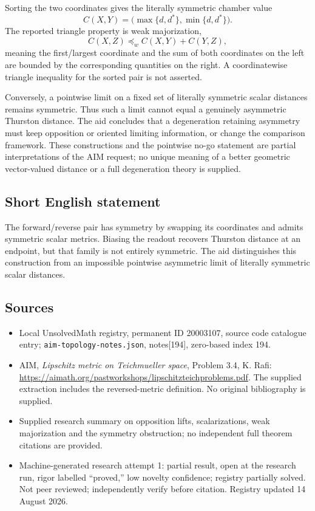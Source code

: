 \documentclass[11pt]{article}
\begin{document}
Sorting the two coordinates gives the literally symmetric chamber value
\[
 C(X,Y)=\bigl(\max\{d,d^*\},\min\{d,d^*\}\bigr).
\]
The reported triangle property is weak majorization,
\[
 C(X,Z)\preceq_w C(X,Y)+C(Y,Z),
\]
meaning the first/largest coordinate and the sum of both coordinates on the left are bounded by the corresponding quantities on the right. A coordinatewise triangle inequality for the sorted pair is not asserted.

Conversely, a pointwise limit on a fixed set of literally symmetric scalar distances remains symmetric. Thus such a limit cannot equal a genuinely asymmetric Thurston distance. The aid concludes that a degeneration retaining asymmetry must keep opposition or oriented limiting information, or change the comparison framework. These constructions and the pointwise no-go statement are partial interpretations of the AIM request; no unique meaning of a better geometric vector-valued distance or a full degeneration theory is supplied.
\subsection{Short English statement}
The forward/reverse pair has symmetry by swapping its coordinates and admits symmetric scalar metrics. Biasing the readout recovers Thurston distance at an endpoint, but that family is not entirely symmetric. The aid distinguishes this construction from an impossible pointwise asymmetric limit of literally symmetric scalar distances.
\subsection{Sources}
\begin{itemize}
\item Local UnsolvedMath registry, permanent ID 20003107, source code catalogue entry; \texttt{aim-topology-notes.json}, notes[194], zero-based index 194.
\item AIM, \emph{Lipschitz metric on Teichmueller space}, Problem 3.4, K. Rafi: \url{https://aimath.org/pastworkshops/lipschitzteichproblems.pdf}. The supplied extraction includes the reversed-metric definition. No original bibliography is supplied.
\item Supplied research summary on opposition lifts, scalarizations, weak majorization and the symmetry obstruction; no independent full theorem citations are provided.
\item Machine-generated research attempt 1: partial result, open at the research run, rigor labelled ``proved,'' low novelty confidence; registry partially solved. Not peer reviewed; independently verify before citation. Registry updated 14 August 2026.
\end{itemize}
\end{document}
